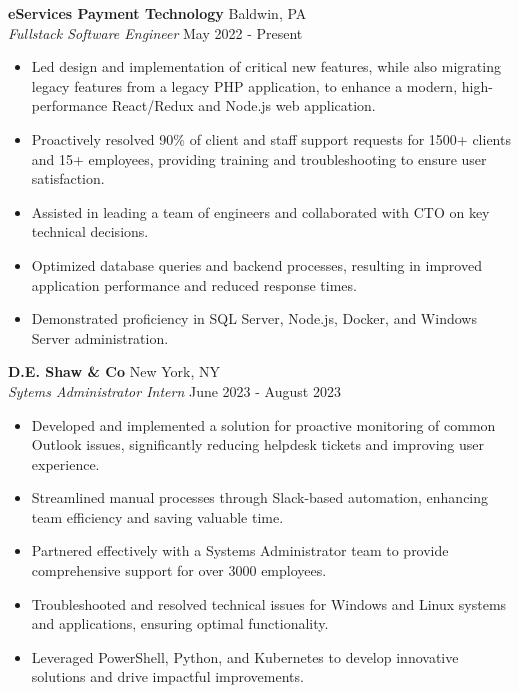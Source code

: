 \documentclass[letterpaper]{article}
\begin{document}
\textbf{eServices Payment Technology} \hfill Baldwin, PA\\
\textit{Fullstack Software Engineer} \hfill May 2022 - Present\\
\vspace{-1mm}
\begin{itemize} \itemsep -1pt
    \item Led design and implementation of critical new features, while also migrating legacy features from a legacy PHP application, to enhance a modern, high-performance React/Redux and Node.js web application.
    \item Proactively resolved 90\% of client and staff support requests for 1500+ clients and 15+ employees, providing training and troubleshooting to ensure user satisfaction.
    \item Assisted in leading a team of engineers and collaborated with CTO on key technical decisions.
    \item Optimized database queries and backend processes, resulting in improved application performance and reduced response times.
    \item Demonstrated proficiency in SQL Server, Node.js, Docker, and Windows Server administration.
\end{itemize}
\vspace{-1mm}
\textbf{D.E. Shaw \& Co} \hfill New York, NY\\
\textit{Sytems Administrator Intern} \hfill June 2023 - August 2023\\
\vspace{-1mm}
\begin{itemize} \itemsep -1pt
	\item Developed and implemented a solution for proactive monitoring of common Outlook issues, significantly reducing helpdesk tickets and improving user experience.
	\item Streamlined manual processes through Slack-based automation, enhancing team efficiency and saving valuable time.
	\item Partnered effectively with a Systems Administrator team to provide comprehensive support for over 3000 employees.
	\item Troubleshooted and resolved technical issues for Windows and Linux systems and applications, ensuring optimal functionality.
	\item Leveraged PowerShell, Python, and Kubernetes to develop innovative solutions and drive impactful improvements.
\end{itemize}
\vspace{-1mm}
\end{document}

